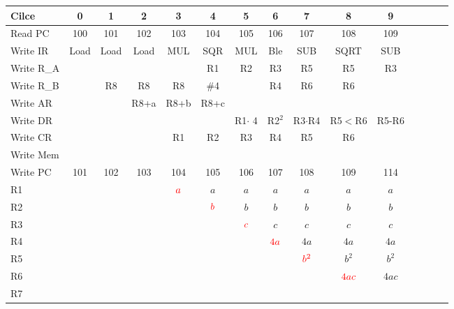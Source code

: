 \documentclass[border=2]{standalone}
\newcommand{\red}[1]{{\color{red}#1}}
\begin{document}
\begin{tabular}
{|l		| c	| c	| c	| c		| c		| c		| c		| c		| c		| c		| c						| c						| c					| c					|}\hline
Cilce		& 0	& 1	& 2	& 3		& 4		& 5		& 6		& 7		& 8		& 9		\\\hline\hline

Read PC		& 100	& 101	& 102	& 103		& 104		& 105		& 106		& 107		& 108		& 109		\\
Write IR	& Load	& Load	& Load	& MUL		& SQR		& MUL 		& Ble		& SUB		& SQRT		& SUB		\\\hline

Write R\_A	&	&	&	&		& R1		& R2		& R3		& R5 		& R5		& R3		\\
Write R\_B	&	& R8	& R8	& R8		& \#4		&		& R4		& R6		& R6		&		\\\hline

Write AR	&	&	& R8+a	& R8+b		& R8+c		&		&		&		&		&		\\
Write DR	&	&	&	&		&		& R1$\cdot$ 4	& R2$^2$	& R3$\cdot$R4	& R5$<$R6	& R5-R6		\\\hline

Write CR	&	&	&	& R1		& R2		& R3		& R4		& R5		& R6		&		\\
Write Mem	&	&	&	&		&		&		&		&		&		&		\\
Write PC	& 101	& 102	& 103	& 104		& 105		& 106		& 107		& 108		& 109		& 114		\\\hline\hline

R1		&	&	&	& $\red{a}$	& $a$		& $a$		& $a$		& $a$		& $a$		& $a$	\\
R2		&	&	&	&		& $\red{b}$	& $b$		& $b$		& $b$		& $b$		& $b$	\\
R3		&	&	&	&		&		& $\red{c}$	& $c$		& $c$		& $c$		& $c$	\\
R4		&	&	&	&		&		&		& $\red{4a}$	& $4a$		& $4a$		& $4a$			\\
R5		&	&	&	&		&		&		&		& $\red{b^2}$	& $b^2$		& $b^2$	\\
R6		&	&	&	&		&		&		&		&		& $\red{4ac}$	& $4ac$	\\
R7		&	&	&	&		&		&		&		&		&		&	\\\hline

\end{tabular}
\end{document}
